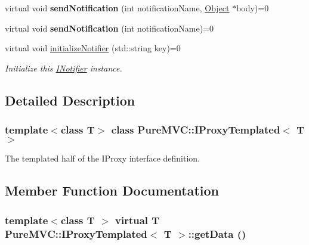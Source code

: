 \begin{DoxyCompactItemize}
\item 
\hypertarget{class_pure_m_v_c_1_1_i_notifier_a4d6bac0719be96948e4f7417489daeaa}{
virtual void {\bfseries sendNotification} (int notificationName, \hyperlink{class_pure_m_v_c_1_1_object}{Object} $\ast$body)=0}
\label{class_pure_m_v_c_1_1_i_notifier_a4d6bac0719be96948e4f7417489daeaa}

\item 
\hypertarget{class_pure_m_v_c_1_1_i_notifier_aca921608a2ced017a8face049fc7c6af}{
virtual void {\bfseries sendNotification} (int notificationName)=0}
\label{class_pure_m_v_c_1_1_i_notifier_aca921608a2ced017a8face049fc7c6af}

\item 
virtual void \hyperlink{class_pure_m_v_c_1_1_i_notifier_a28d7dbbe0726d4d52080546c5d79b232}{initializeNotifier} (std::string key)=0
\begin{DoxyCompactList}\small\item\em Initialize this \hyperlink{class_pure_m_v_c_1_1_i_notifier}{INotifier} instance. \item\end{DoxyCompactList}\end{DoxyCompactItemize}


\subsection{Detailed Description}
\subsubsection*{template$<$class T$>$ class PureMVC::IProxyTemplated$<$ T $>$}

The templated half of the {\ttfamily IProxy} interface definition. 

\subsection{Member Function Documentation}
\hypertarget{class_pure_m_v_c_1_1_i_proxy_templated_ab6cf7f1c41002c84a7f48d65b0d2e388}{
\subsubsection[{getData}]{\setlength{\rightskip}{0pt plus 5cm}template$<$class T $>$ virtual T {\bf PureMVC::IProxyTemplated}$<$ T $>$::getData ()}}
\label{class_pure_m_v_c_1_1_i_proxy_templated_ab6cf7f1c41002c84a7f48d65b0d2e388}


